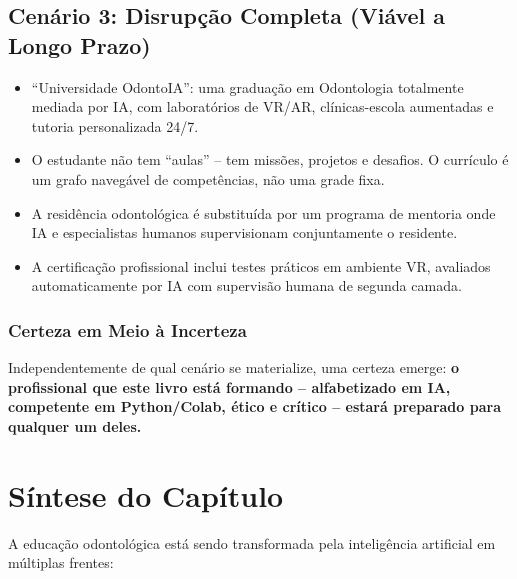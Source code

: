 \subsection{Cenário 3: Disrupção Completa (Viável a Longo Prazo)}

\begin{itemize}
  \item ``Universidade OdontoIA'': uma graduação em Odontologia totalmente
    mediada por IA, com laboratórios de VR/AR, clínicas-escola aumentadas e
    tutoria personalizada 24/7.
  \item O estudante não tem ``aulas'' -- tem missões, projetos e desafios. O
    currículo é um grafo navegável de competências, não uma grade fixa.
  \item A residência odontológica é substituída por um programa de mentoria
    onde IA e especialistas humanos supervisionam conjuntamente o residente.
  \item A certificação profissional inclui testes práticos em ambiente VR,
    avaliados automaticamente por IA com supervisão humana de segunda camada.
\end{itemize}

\subsubsection{Certeza em Meio à Incerteza}

Independentemente de qual cenário se materialize, uma certeza emerge: \textbf{o
profissional que este livro está formando -- alfabetizado em IA, competente em
Python/Colab, ético e crítico -- estará preparado para qualquer um deles.}

\section{Síntese do Capítulo}

A educação odontológica está sendo transformada pela inteligência artificial em
múltiplas frentes:

